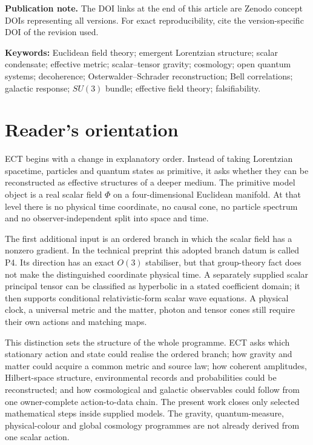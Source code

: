 \documentclass[11pt,a4paper]{article}
\begin{document}
\smallskip
\noindent\textbf{Publication note.}
The DOI links at the end of this article are Zenodo concept DOIs representing
all versions.  For exact reproducibility, cite the version-specific DOI of the
revision used.

\medskip
\noindent\textbf{Keywords:}
Euclidean field theory; emergent Lorentzian structure; scalar condensate;
effective metric; scalar--tensor gravity; cosmology; open quantum systems;
decoherence; Osterwalder--Schrader reconstruction; Bell correlations;
galactic response; $SU(3)$ bundle; effective field theory; falsifiability.

\section*{Reader's orientation}

ECT begins with a change in explanatory order.  Instead of taking Lorentzian
spacetime, particles and quantum states as primitive, it asks whether they can
be reconstructed as effective structures of a deeper medium.  The primitive
model object is a real scalar field $\Phi$ on a four-dimensional Euclidean
manifold.  At that level there is no physical time coordinate, no causal cone,
no particle spectrum and no observer-independent split into space and time.

The first additional input is an ordered branch in which the scalar field has
a nonzero gradient.  In the technical preprint this adopted branch datum is
called P4.  Its direction has an exact $O(3)$ stabiliser, but that group-theory
fact does not make the distinguished coordinate physical time.  A separately
supplied scalar principal tensor can be classified as hyperbolic in a stated
coefficient domain; it then supports conditional relativistic-form scalar wave
equations.  A physical clock, a universal metric and the matter, photon and
tensor cones still require their own actions and matching maps.

This distinction sets the structure of the whole programme.  ECT asks which
stationary action and state could realise the ordered branch; how gravity and
matter could acquire a common metric and source law; how coherent amplitudes,
Hilbert-space structure, environmental records and probabilities could be
reconstructed; and how cosmological and galactic observables could follow from
one owner-complete action-to-data chain.  The present work closes only selected
mathematical steps inside supplied models.  The gravity, quantum-measure,
physical-colour and global cosmology programmes are not already derived from
one scalar action.
\end{document}
